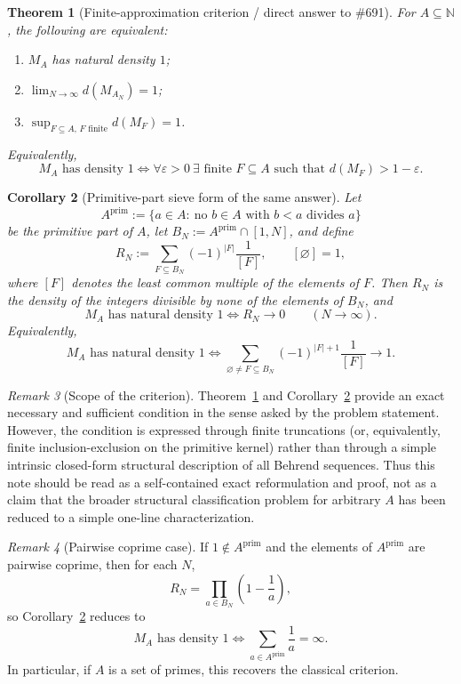 \documentclass[11pt]{article}
\newtheorem{theorem}{Theorem}
\newtheorem{corollary}[theorem]{Corollary}
\theoremstyle{definition}
\theoremstyle{remark}
\newtheorem{remark}[theorem]{Remark}
\newcommand{\N}{\mathbb N}
\newcommand{\PP}{A^{\mathrm{prim}}}
\begin{document}
\begin{theorem}[Finite-approximation criterion / direct answer to \#691]\label{thm:finite-approx}
For \(A\subseteq\N\), the following are equivalent:
\begin{enumerate}
\item \(M_A\) has natural density \(1\);
\item \(\lim_{N\to\infty} d(M_{A_N})=1\);
\item \(\sup_{F\subseteq A,\,F\text{ finite}} d(M_F)=1\).
\end{enumerate}
Equivalently,
\[
M_A\text{ has density }1
\iff
\forall\varepsilon>0\ \exists\text{ finite }F\subseteq A
\text{ such that } d(M_F)>1-\varepsilon.
\]
\end{theorem}

\begin{corollary}[Primitive-part sieve form of the same answer]\label{cor:main-sieve-answer}
Let
\[
\PP:=\{a\in A:\ \text{no }b\in A\text{ with }b<a\text{ divides }a\}
\]
be the primitive part of \(A\), let \(B_N:=\PP\cap[1,N]\), and define
\[
R_N:=\sum_{F\subseteq B_N} (-1)^{|F|}\frac1{[F]},
\qquad [\varnothing]=1,
\]
where \([F]\) denotes the least common multiple of the elements of \(F\).
Then \(R_N\) is the density of the integers divisible by none of the elements of \(B_N\), and
\[
M_A\text{ has natural density }1
\iff
R_N\to 0
\qquad (N\to\infty).
\]
Equivalently,
\[
M_A\text{ has natural density }1
\iff
\sum_{\varnothing\neq F\subseteq B_N} (-1)^{|F|+1}\frac1{[F]}\to 1.
\]
\end{corollary}

\begin{remark}[Scope of the criterion]
Theorem~\ref{thm:finite-approx} and Corollary~\ref{cor:main-sieve-answer} provide an exact necessary and sufficient condition in the sense asked by the problem statement.
However, the condition is expressed through finite truncations (or, equivalently, finite inclusion-exclusion on the primitive kernel) rather than through a simple intrinsic closed-form structural description of all Behrend sequences.
Thus this note should be read as a self-contained exact reformulation and proof, not as a claim that the broader structural classification problem for arbitrary \(A\) has been reduced to a simple one-line characterization.
\end{remark}

\begin{remark}[Pairwise coprime case]
If \(1\notin \PP\) and the elements of \(\PP\) are pairwise coprime, then for each \(N\),
\[
R_N=\prod_{a\in B_N}\left(1-\frac1a\right),
\]
so Corollary~\ref{cor:main-sieve-answer} reduces to
\[
M_A\text{ has density }1
\iff
\sum_{a\in \PP}\frac1a=\infty.
\]
In particular, if \(A\) is a set of primes, this recovers the classical criterion.
\end{remark}
\end{document}
